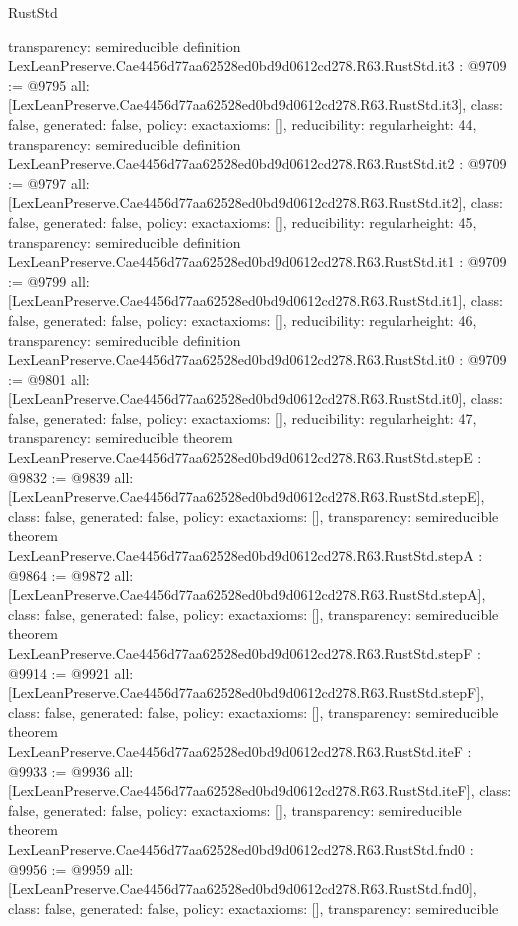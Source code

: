 \begin{lexlean}{RustStd}
\begin{coremodule}
{  transparency: semireducible
}
definition LexLeanPreserve.Cae4456d77aa62528ed0bd9d0612cd278.R63.RustStd.it3 : @9709 := @9795 {
  all: [LexLeanPreserve.Cae4456d77aa62528ed0bd9d0612cd278.R63.RustStd.it3],
  class: false,
  generated: false,
  policy: exact{axioms: []},
  reducibility: regular{height: 44},
  transparency: semireducible
}
definition LexLeanPreserve.Cae4456d77aa62528ed0bd9d0612cd278.R63.RustStd.it2 : @9709 := @9797 {
  all: [LexLeanPreserve.Cae4456d77aa62528ed0bd9d0612cd278.R63.RustStd.it2],
  class: false,
  generated: false,
  policy: exact{axioms: []},
  reducibility: regular{height: 45},
  transparency: semireducible
}
definition LexLeanPreserve.Cae4456d77aa62528ed0bd9d0612cd278.R63.RustStd.it1 : @9709 := @9799 {
  all: [LexLeanPreserve.Cae4456d77aa62528ed0bd9d0612cd278.R63.RustStd.it1],
  class: false,
  generated: false,
  policy: exact{axioms: []},
  reducibility: regular{height: 46},
  transparency: semireducible
}
definition LexLeanPreserve.Cae4456d77aa62528ed0bd9d0612cd278.R63.RustStd.it0 : @9709 := @9801 {
  all: [LexLeanPreserve.Cae4456d77aa62528ed0bd9d0612cd278.R63.RustStd.it0],
  class: false,
  generated: false,
  policy: exact{axioms: []},
  reducibility: regular{height: 47},
  transparency: semireducible
}
theorem LexLeanPreserve.Cae4456d77aa62528ed0bd9d0612cd278.R63.RustStd.stepE : @9832 := @9839 {
  all: [LexLeanPreserve.Cae4456d77aa62528ed0bd9d0612cd278.R63.RustStd.stepE],
  class: false,
  generated: false,
  policy: exact{axioms: []},
  transparency: semireducible
}
theorem LexLeanPreserve.Cae4456d77aa62528ed0bd9d0612cd278.R63.RustStd.stepA : @9864 := @9872 {
  all: [LexLeanPreserve.Cae4456d77aa62528ed0bd9d0612cd278.R63.RustStd.stepA],
  class: false,
  generated: false,
  policy: exact{axioms: []},
  transparency: semireducible
}
theorem LexLeanPreserve.Cae4456d77aa62528ed0bd9d0612cd278.R63.RustStd.stepF : @9914 := @9921 {
  all: [LexLeanPreserve.Cae4456d77aa62528ed0bd9d0612cd278.R63.RustStd.stepF],
  class: false,
  generated: false,
  policy: exact{axioms: []},
  transparency: semireducible
}
theorem LexLeanPreserve.Cae4456d77aa62528ed0bd9d0612cd278.R63.RustStd.iteF : @9933 := @9936 {
  all: [LexLeanPreserve.Cae4456d77aa62528ed0bd9d0612cd278.R63.RustStd.iteF],
  class: false,
  generated: false,
  policy: exact{axioms: []},
  transparency: semireducible
}
theorem LexLeanPreserve.Cae4456d77aa62528ed0bd9d0612cd278.R63.RustStd.fnd0 : @9956 := @9959 {
  all: [LexLeanPreserve.Cae4456d77aa62528ed0bd9d0612cd278.R63.RustStd.fnd0],
  class: false,
  generated: false,
  policy: exact{axioms: []},
  transparency: semireducible
}
\end{coremodule}
\end{lexlean}
